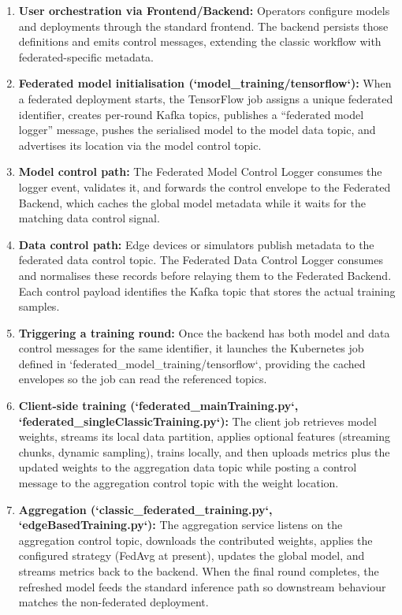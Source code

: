 \begin{enumerate}
    \item \textbf{User orchestration via Frontend/Backend:} Operators configure models and deployments through the standard frontend. The backend persists those definitions and emits control messages, extending the classic workflow with federated-specific metadata.

    \item \textbf{Federated model initialisation (`model\_training/tensorflow`):} When a federated deployment starts, the TensorFlow job assigns a unique federated identifier, creates per-round Kafka topics, publishes a ``federated model logger'' message, pushes the serialised model to the model data topic, and advertises its location via the model control topic.

    \item \textbf{Model control path:} The Federated Model Control Logger consumes the logger event, validates it, and forwards the control envelope to the Federated Backend, which caches the global model metadata while it waits for the matching data control signal.

    \item \textbf{Data control path:} Edge devices or simulators publish metadata to the federated data control topic. The Federated Data Control Logger consumes and normalises these records before relaying them to the Federated Backend. Each control payload identifies the Kafka topic that stores the actual training samples.

    \item \textbf{Triggering a training round:} Once the backend has both model and data control messages for the same identifier, it launches the Kubernetes job defined in `federated\_model\_training/tensorflow`, providing the cached envelopes so the job can read the referenced topics.

    \item \textbf{Client-side training (`federated_mainTraining.py`, `federated_singleClassicTraining.py`):} The client job retrieves model weights, streams its local data partition, applies optional features (streaming chunks, dynamic sampling), trains locally, and then uploads metrics plus the updated weights to the aggregation data topic while posting a control message to the aggregation control topic with the weight location.

    \item \textbf{Aggregation (`classic_federated_training.py`, `edgeBasedTraining.py`):} The aggregation service listens on the aggregation control topic, downloads the contributed weights, applies the configured strategy (FedAvg at present), updates the global model, and streams metrics back to the backend. When the final round completes, the refreshed model feeds the standard inference path so downstream behaviour matches the non-federated deployment.
\end{enumerate}

